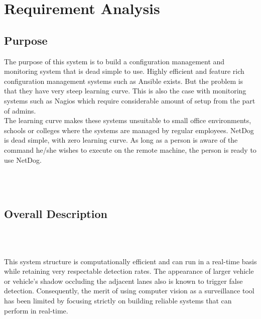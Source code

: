 \chapter{Requirement Analysis}

\section{Purpose}
\par
The purpose of this system is to build a configuration management and monitoring
system that is dead simple to use. Highly efficient and feature rich
configuration management systems such as Ansible exists. But the problem is that
they have very steep learning curve. This is also the case with monitoring
systems such as Nagios which require considerable amount of setup from the part
of admins. \\

The learning curve makes these systems unsuitable to small office environments,
schools or colleges where the systems are managed by regular employees. NetDog
is dead simple, with zero learning curve. As long as a person is aware of the
command he/she wishes to execute on the remote machine, the person is ready to
use NetDog.
	
\\
\\
\section{Overall Description}
\\
\\
\par This system structure is computationally efficient and can run in a real-time basis while retaining very respectable detection rates. The appearance of larger vehicle or vehicle's shadow occluding the adjacent lanes also is known to trigger false detection. Consequently, the merit of using computer vision as a surveillance tool has been limited by focusing strictly on building reliable systems that can perform in real-time.\\

